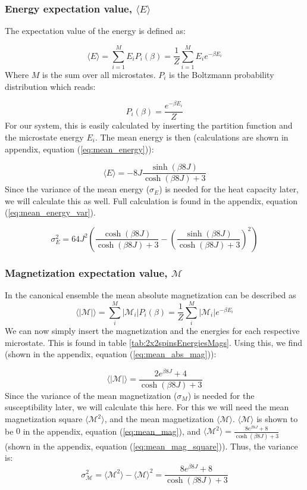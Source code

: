 \documentclass[../main.tex]{subfiles}
\begin{document}
\subsubsection*{Energy expectation value, $\langle E \rangle$}
The expectation value of the energy is defined as:

\[\langle E \rangle = \sum_{i=1}^M E_i P_i(\beta) = \frac{1}{Z}\sum_{i=1}^M E_i e^{-\beta E_i}\]
Where $M$ is the sum over all microstates. $P_i$ is the Boltzmann probability distribution which reads:

\[P_i(\beta) = \frac{e^{-\beta E_i}}{Z}\]
For our system, this is easily calculated by inserting the partition function and the microstate energy $E_i$. The mean energy is then (calculations are shown in appendix, equation (\ref{eq:mean_energy})):

\begin{equation*}
  \langle E \rangle = -8J\frac{\sinh(\beta 8 J)}{\cosh(\beta 8 J) + 3}
\end{equation*}
Since the variance of the mean energy ($\sigma_E$) is needed for the heat capacity later, we will calculate this as well. Full calculation is found in the appendix, equation (\ref{eq:mean_energy_var}).

\begin{equation*}
  \sigma_E^2 = 64J^2\left(\frac{\cosh(\beta 8J)}{\cosh(\beta 8 J) + 3} - \left(\frac{\sinh(\beta 8 J)}{\cosh(\beta 8 J) + 3}\right)^2\right)
\end{equation*}

\subsubsection*{Magnetization expectation value, $\mathcal{M}$}
In the canonical ensemble the mean absolute magnetization can be described as
\[\langle |\mathcal{M}| \rangle = \sum_i^M |\mathcal{M}_i| P_i(\beta) = \frac{1}{Z} \sum_i^M |\mathcal{M}_i| e^{-\beta E_i}\]
We can now simply insert the magnetization and the energies for each respective microstate. This is found in table \ref{tab:2x2spinsEnergiesMags}. Using this, we find (shown in the appendix, equation (\ref{eq:mean_abs_mag})):

\begin{equation*}
  \langle \mathcal{|M|} \rangle = \frac{ 2e^{\beta 8J} + 4}{\cosh(\beta 8J) + 3}
\end{equation*}
Since the variance of the mean magnetization ($\sigma_M$) is needed for the susceptibility later, we will calculate this here. For this we will need the mean magnetization square $\langle \mathcal{M}^2 \rangle$, and the mean magnetization $\langle \mathcal{M} \rangle$. $\langle \mathcal{M} \rangle$ is shown to be $0$ in the appendix, equation (\ref{eq:mean_mag}), and  $\langle \mathcal{M}^2 \rangle = \frac{8 e^{\beta8J} +  8}{\cosh(\beta 8J) + 3}$ (shown in the appendix, equation (\ref{eq:mean_mag_square})). Thus, the variance is:
\begin{equation*}
  \sigma^2_\mathcal{M} = \langle \mathcal{M}^2 \rangle - \langle \mathcal{M} \rangle ^2 = \frac{8 e^{\beta8J} +  8}{\cosh(\beta 8J) + 3}
\end{equation*}
\end{document}
